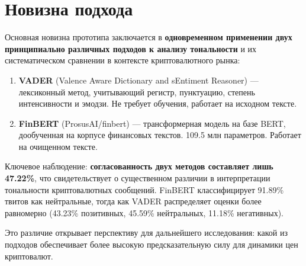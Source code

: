 \documentclass[a4paper,12pt]{article}
\begin{document}

\section{Новизна подхода}

Основная новизна прототипа заключается в \textbf{одновременном применении двух
принципиально различных подходов к анализу тональности} и их систематическом
сравнении в контексте криптовалютного рынка:

\begin{enumerate}
  \item \textbf{VADER} (Valence Aware Dictionary and sEntiment Reasoner) ---
        лексиконный метод, учитывающий регистр, пунктуацию, степень интенсивности
        и эмодзи. Не требует обучения, работает на исходном тексте.
  \item \textbf{FinBERT} (ProsusAI/finbert) --- трансформерная модель на базе BERT,
        дообученная на корпусе финансовых текстов. 109.5 млн параметров.
        Работает на очищенном тексте.
\end{enumerate}

Ключевое наблюдение: \textbf{согласованность двух методов составляет лишь 47.22\%},
что свидетельствует о существенном различии в интерпретации тональности
криптовалютных сообщений. FinBERT классифицирует 91.89\% твитов как нейтральные,
тогда как VADER распределяет оценки более равномерно (43.23\% позитивных,
45.59\% нейтральных, 11.18\% негативных).

Это различие открывает перспективу для дальнейшего исследования:
какой из подходов обеспечивает более высокую предсказательную силу
для динамики цен криптовалют.
\end{document}
